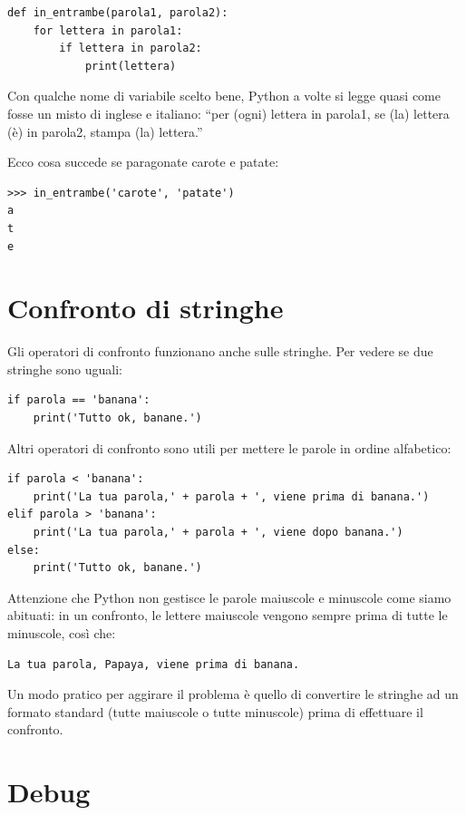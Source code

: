 \documentclass[10pt]{book}
\begin{document}
\begin{verbatim}
def in_entrambe(parola1, parola2):
    for lettera in parola1:
        if lettera in parola2:
            print(lettera)
\end{verbatim}
%
Con qualche nome di variabile scelto bene, Python a volte si legge quasi come fosse un misto di inglese e italiano: ``per (ogni) lettera in parola1, se (la) lettera (è) in parola2, stampa (la) lettera.''

Ecco cosa succede se paragonate carote e patate:

\begin{verbatim}
>>> in_entrambe('carote', 'patate')
a
t
e
\end{verbatim}
%

\section{Confronto di stringhe}

Gli operatori di confronto funzionano anche sulle stringhe. Per vedere se
due stringhe sono uguali:

\begin{verbatim}
if parola == 'banana':
    print('Tutto ok, banane.')
\end{verbatim}
%
Altri operatori di confronto sono utili per mettere le parole in ordine alfabetico:

\begin{verbatim}
if parola < 'banana':
    print('La tua parola,' + parola + ', viene prima di banana.')
elif parola > 'banana':
    print('La tua parola,' + parola + ', viene dopo banana.')
else:
    print('Tutto ok, banane.')
\end{verbatim}
%
Attenzione che Python non gestisce le parole maiuscole e minuscole come siamo abituati: in un confronto, le lettere maiuscole vengono sempre prima di tutte le minuscole, così che:

\begin{verbatim}
La tua parola, Papaya, viene prima di banana.
\end{verbatim}
%
Un modo pratico per aggirare il problema è quello di convertire le stringhe ad un formato standard (tutte maiuscole o tutte minuscole) prima di effettuare il confronto.


\section{Debug}
\end{document}

